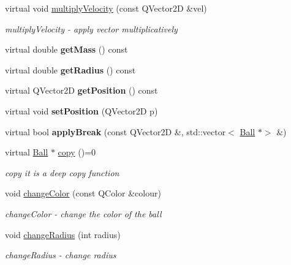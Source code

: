 \begin{DoxyCompactItemize}
virtual void \mbox{\hyperlink{class_ball_aacc57301046fab52930f7615073136e0}{multiply\+Velocity}} (const Q\+Vector2D \&vel)
\begin{DoxyCompactList}\small\item\em multiply\+Velocity -\/ apply vector multiplicatively \end{DoxyCompactList}\item 
\mbox{\label{class_ball_a4b8e6ae922e7c1bfe6ab4568a591580e}} 
virtual double {\bfseries get\+Mass} () const
\item 
\mbox{\label{class_ball_a311b644cb28ee7c864806312ff52a594}} 
virtual double {\bfseries get\+Radius} () const
\item 
\mbox{\label{class_ball_a8861d6e0221d1b4d8468458fc2ec9b3c}} 
virtual Q\+Vector2D {\bfseries get\+Position} () const
\item 
\mbox{\label{class_ball_af656c9b3f7eb0f966f71eb100323559f}} 
virtual void {\bfseries set\+Position} (Q\+Vector2D p)
\item 
\mbox{\label{class_ball_a9df4c9fc8620d003cf9717d84e64d5ee}} 
virtual bool {\bfseries apply\+Break} (const Q\+Vector2D \&, std\+::vector$<$ \mbox{\hyperlink{class_ball}{Ball}} $\ast$$>$ \&)
\item 
virtual \mbox{\hyperlink{class_ball}{Ball}} $\ast$ \mbox{\hyperlink{class_ball_ae6c0731fabb7a45ba36df62a1975661a}{copy}} ()=0
\begin{DoxyCompactList}\small\item\em copy it is a deep copy function \end{DoxyCompactList}\item 
void \mbox{\hyperlink{class_ball_ac68ba5765f29f3322c2f2de3fc61e5ae}{change\+Color}} (const Q\+Color \&colour)
\begin{DoxyCompactList}\small\item\em change\+Color -\/ change the color of the ball \end{DoxyCompactList}\item 
void \mbox{\hyperlink{class_ball_a8e53255b6e2867060205bc037fcd6744}{change\+Radius}} (int radius)
\begin{DoxyCompactList}\small\item\em change\+Radius -\/ change radius \end{DoxyCompactList}\end{DoxyCompactItemize}
